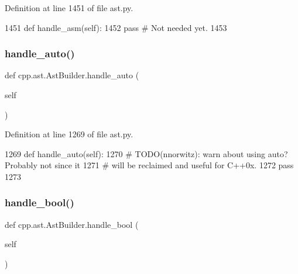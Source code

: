 Definition at line 1451 of file ast.\+py.


\begin{DoxyCode}
1451     \textcolor{keyword}{def }handle\_asm(self):
1452         \textcolor{keywordflow}{pass}  \textcolor{comment}{# Not needed yet.}
1453 
\end{DoxyCode}
\mbox{\label{classcpp_1_1ast_1_1AstBuilder_a0cb490894f17a6c34fbe6bb8f7a2e626}} 
\subsubsection{\texorpdfstring{handle\+\_\+auto()}{handle\_auto()}}
{\footnotesize\ttfamily def cpp.\+ast.\+Ast\+Builder.\+handle\+\_\+auto (\begin{DoxyParamCaption}\item[{}]{self }\end{DoxyParamCaption})}



Definition at line 1269 of file ast.\+py.


\begin{DoxyCode}
1269     \textcolor{keyword}{def }handle\_auto(self):
1270         \textcolor{comment}{# TODO(nnorwitz): warn about using auto?  Probably not since it}
1271         \textcolor{comment}{# will be reclaimed and useful for C++0x.}
1272         \textcolor{keywordflow}{pass}
1273 
\end{DoxyCode}
\mbox{\label{classcpp_1_1ast_1_1AstBuilder_ac5a5e19e5be6501d351891cc0ead5f53}} 
\subsubsection{\texorpdfstring{handle\+\_\+bool()}{handle\_bool()}}
{\footnotesize\ttfamily def cpp.\+ast.\+Ast\+Builder.\+handle\+\_\+bool (\begin{DoxyParamCaption}\item[{}]{self }\end{DoxyParamCaption})}




